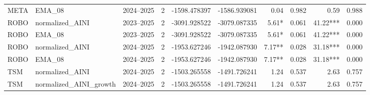 \begin{table}[H]
{\begin{tabular}{l l l r r r r r r r}
META & EMA\_08 & 2024--2025 & 2 & -1598.478397 & -1586.939081 & 0.04 & 0.982 & 0.59 & 0.988 \\
ROBO & normalized\_AINI & 2023--2025 & 2 & -3091.928522 & -3079.087335 & 5.61* & 0.061 & 41.22*** & 0.000 \\
ROBO & EMA\_08 & 2023--2025 & 2 & -3091.928522 & -3079.087335 & 5.61* & 0.061 & 41.22*** & 0.000 \\
ROBO & normalized\_AINI & 2024--2025 & 2 & -1953.627246 & -1942.087930 & 7.17** & 0.028 & 31.18*** & 0.000 \\
ROBO & EMA\_08 & 2024--2025 & 2 & -1953.627246 & -1942.087930 & 7.17** & 0.028 & 31.18*** & 0.000 \\
TSM & normalized\_AINI & 2024--2025 & 2 & -1503.265558 & -1491.726241 & 1.24 & 0.537 & 2.63 & 0.757 \\
TSM & normalized\_AINI\_growth & 2024--2025 & 2 & -1503.265558 & -1491.726241 & 1.24 & 0.537 & 2.63 & 0.757 \\
\bottomrule
\end{tabular}

}
\end{table}